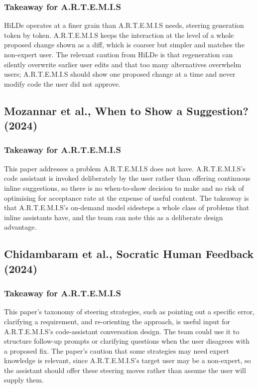 \documentclass[11pt,a4paper]{report}
\newcommand{\artemis}{A.R.T.E.M.I.S}
\begin{document}
\subsubsection{Takeaway for \artemis{}}

HiLDe operates at a finer grain than \artemis{} needs, steering
generation token by token. \artemis{} keeps the interaction at the level
of a whole proposed change shown as a diff, which is coarser but
simpler and matches the non-expert user. The relevant caution from
HiLDe is that regeneration can silently overwrite earlier user edits and
that too many alternatives overwhelm users; \artemis{} should show one
proposed change at a time and never modify code the user did not
approve.

\subsection{Mozannar et al., When to Show a Suggestion? (2024)}

\subsubsection{Takeaway for \artemis{}}

This paper addresses a problem \artemis{} does not have. \artemis{}'s
code assistant is invoked deliberately by the user rather than offering
continuous inline suggestions, so there is no when-to-show decision to
make and no risk of optimising for acceptance rate at the expense of
useful content. The takeaway is that \artemis{}'s on-demand model
sidesteps a whole class of problems that inline assistants have, and the
team can note this as a deliberate design advantage.

\subsection{Chidambaram et al., Socratic Human Feedback (2024)}

\subsubsection{Takeaway for \artemis{}}

This paper's taxonomy of steering strategies, such as pointing out a
specific error, clarifying a requirement, and re-orienting the approach,
is useful input for \artemis{}'s code-assistant conversation design. The
team could use it to structure follow-up prompts or clarifying
questions when the user disagrees with a proposed fix. The paper's
caution that some strategies may need expert knowledge is relevant,
since \artemis{}'s target user may be a non-expert, so the assistant
should offer these steering moves rather than assume the user will
supply them.
\end{document}
